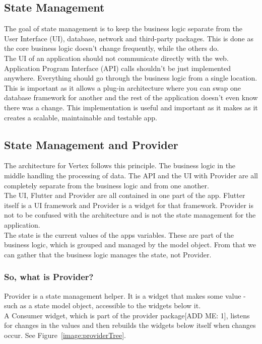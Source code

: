 \subsection{State Management}
The goal of state management is to keep the business logic separate from the User Interface (UI), database, network and third-party packages. This is done as the core business logic doesn't change frequently, while the others do.
\\ The UI of an application should not communicate directly with the web. Application Program Interface (API) calls shouldn't be just implemented anywhere. Everything should go through the business logic from a single location.
\\ This is important as it allows a plug-in architecture where you can swap one database framework for another and the rest of the application doesn't even know there was a change. This implementation is useful and important as it makes as it creates a scalable, maintainable and testable app.

\subsection{State Management and Provider}
The architecture for Vertex follows this principle. The business logic in the middle handling the processing of data. The API and the UI with Provider are all completely separate from the business logic and from one another.
\\ The UI, Flutter and Provider are all contained in one part of the app. Flutter itself is a UI framework and Provider is a widget for that framework. Provider is not to be confused with the architecture and is not the state management for the application.
\\ The state is the current values of the apps variables. These are part of the business logic, which is grouped and managed by the model object. From that we can gather that the business logic manages the state, not Provider.

\subsubsection{So, what is Provider?}
Provider is a state management helper. It is a widget that makes some value - such as a state model object, accessible to the widgets below it.
\\ A Consumer widget, which is part of the provider package[ADD ME: 1], listens for changes in the values and then rebuilds the widgets below itself when changes occur.
See Figure~\ref{image:providerTree}.

